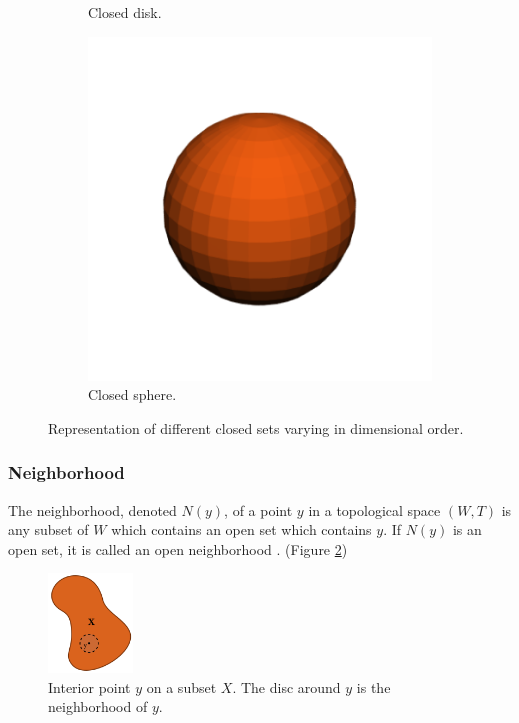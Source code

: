 \documentclass[a4paper,11pt,oneside]{article}
\begin{document}
\begin{figure}[ht]
\begin{subfigure}[b]{0.2\textwidth}
         \caption{Closed disk.}
     \end{subfigure}
     \hfill
     \begin{subfigure}[b]{0.2\textwidth}
         \centering
         \includegraphics[width=\textwidth]{section3/3.2/closed-sphere.png}
         \caption{Closed sphere.}
     \end{subfigure}
     \hfill
        \caption{Representation of different closed sets varying in dimensional order.}
        \label{sec3.2:closed-sets}
\end{figure}

\subsubsection{Neighborhood}
     
\begin{definition}
	The neighborhood, denoted $N(y)$, of a point $y$ in a topological space $(W, T)$ is any subset of $W$ which contains an open set which contains $y$. If $N(y)$ is an open set, it is called an open neighborhood \cite{Requicha1978MathematicalFO}. (Figure \ref{sec3.2:interior-neighborhood})
\end{definition}

\begin{figure}[ht]
	\begin{center}
		\includegraphics[width=0.2\textwidth]{section3/3.2/interior.png}
	\end{center}
	\caption{Interior point $y$ on a subset $X$. The disc around $y$ is the neighborhood of $y$.}
	\label{sec3.2:interior-neighborhood}
\end{figure}
    
\end{document}

